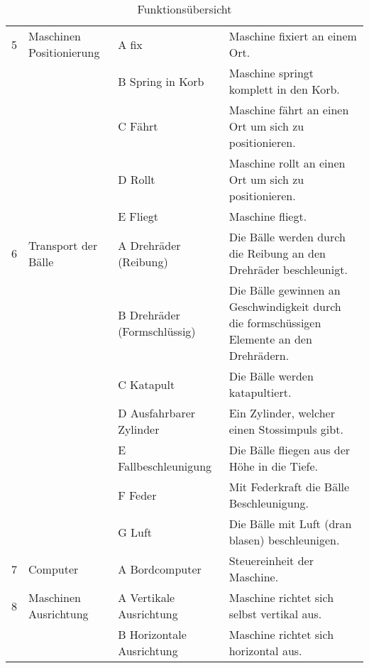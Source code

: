 \begin{table}[h!]
\begin{tabular}{l p{3cm} p{4.5cm} p{8cm}}
	
		
	    5 & Maschinen Positionierung & A fix & Maschine fixiert an einem Ort. \\
		 &  & B Spring in Korb & Maschine springt komplett in den Korb. \\
		 &  & C Fährt & Maschine fährt an einen Ort um sich zu positionieren. \\
		 &  & D Rollt & Maschine rollt an einen Ort um sich zu positionieren. \\
		 &  & E Fliegt & Maschine fliegt. \\
		
	
	    6 & Transport der Bälle & A Drehräder (Reibung) & Die Bälle werden durch die Reibung an den Drehräder beschleunigt. \\
	     &  & B Drehräder (Formschlüssig) & Die Bälle gewinnen an Geschwindigkeit durch die formschüssigen Elemente an den Drehrädern.  \\
	     &  & C Katapult & Die Bälle werden katapultiert. \\
	     &  & D Ausfahrbarer Zylinder & Ein Zylinder, welcher einen Stossimpuls gibt.  \\
	     &  & E Fallbeschleunigung & Die Bälle fliegen aus der Höhe in die Tiefe. \\
	     &  & F Feder & Mit Federkraft die Bälle Beschleunigung.  \\
	     &  & G Luft & Die Bälle mit Luft (dran blasen) beschleunigen.  \\
		 
		7 & Computer & A Bordcomputer & Steuereinheit der Maschine. \\
		
	
		
		 8 & Maschinen Ausrichtung & A Vertikale Ausrichtung & Maschine richtet sich selbst vertikal aus. \\
		 &  & B Horizontale Ausrichtung & Maschine richtet sich horizontal aus. \\
		 
	\end{tabular}
	\caption{Funktionsübersicht}
	\label{tab:quelle}
\end{table}
